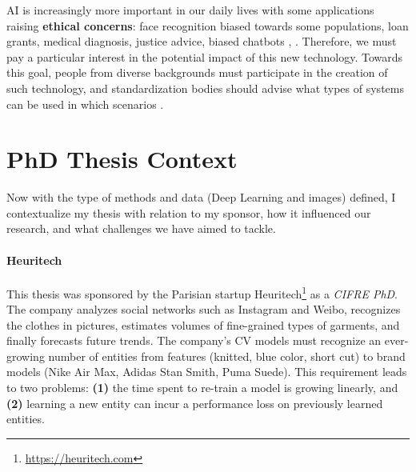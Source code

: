 \ac{AI} is increasingly more important in our daily lives with some applications raising \textbf{ethical
      concerns}: face recognition biased towards some populations, loan grants, medical diagnosis, justice
advice, biased chatbots \citep{sheng2019lmbias}, \etc. Therefore, we must pay a particular interest in the
potential impact of this new technology. Towards this goal, people from diverse backgrounds
must participate in the creation of such technology, and standardization bodies should
advise what types of systems can be used in which scenarios \citep{gebru2019aiethichandbook}.


\section{PhD Thesis Context}

Now with the type of methods and data (Deep Learning and images) defined, I contextualize my
thesis with relation to my sponsor, how it influenced our research, and what challenges we have aimed to tackle.

\paragraph{Heuritech} This thesis was sponsored by the Parisian startup
Heuritech\footnote{\url{https://heuritech.com}} as a \textit{CIFRE PhD}. The company analyzes social
networks such as Instagram and Weibo, recognizes the clothes in pictures, estimates
volumes of fine-grained types of garments, and finally forecasts future trends. The company's
\acf{CV} models must recognize an ever-growing number of entities from features (\eg knitted, blue
color, short cut) to brand models (\eg Nike Air Max, Adidas Stan Smith, Puma Suede). This
requirement leads to two problems: \textbf{(1)} the time spent to re-train a model is growing
linearly, and \textbf{(2)} learning a new entity can incur a performance loss on previously learned
entities.%

